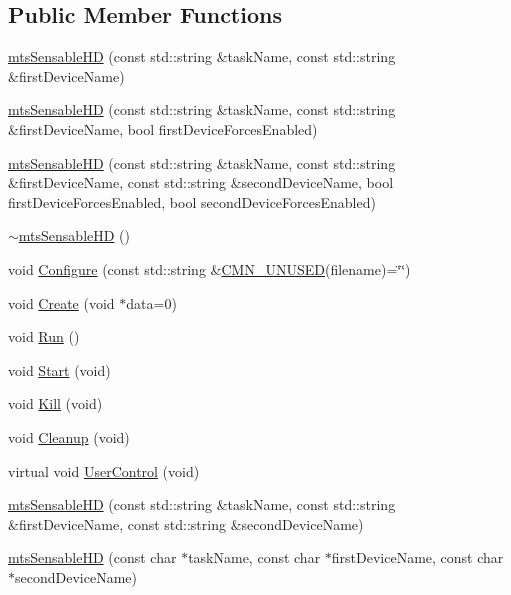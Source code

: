 \subsection*{Public Member Functions}
\begin{DoxyCompactItemize}
\item 
\hyperlink{classmts_sensable_h_d_a8edc1b99888eea9146e97e9e1e4244a2}{mts\+Sensable\+H\+D} (const std\+::string \&task\+Name, const std\+::string \&first\+Device\+Name)
\item 
\hyperlink{classmts_sensable_h_d_a65eb4de4d62c141f61b4c5afaa3b12ca}{mts\+Sensable\+H\+D} (const std\+::string \&task\+Name, const std\+::string \&first\+Device\+Name, bool first\+Device\+Forces\+Enabled)
\item 
\hyperlink{classmts_sensable_h_d_a21ff41ea6bf303e046d42f1c5843d31a}{mts\+Sensable\+H\+D} (const std\+::string \&task\+Name, const std\+::string \&first\+Device\+Name, const std\+::string \&second\+Device\+Name, bool first\+Device\+Forces\+Enabled, bool second\+Device\+Forces\+Enabled)
\item 
\hyperlink{classmts_sensable_h_d_a9fbacf9fb330e6acb3715bcb1f6ff66e}{$\sim$mts\+Sensable\+H\+D} ()
\item 
void \hyperlink{classmts_sensable_h_d_a3819baf43b57192a1a339a942d2fa0d7}{Configure} (const std\+::string \&\hyperlink{cmn_portability_8h_a021894e2626935fa2305434b1e893ff6}{C\+M\+N\+\_\+\+U\+N\+U\+S\+E\+D}(filename)=\char`\"{}\char`\"{})
\item 
void \hyperlink{classmts_sensable_h_d_a842668ae5afc97ce4513ef6c619e0a3c}{Create} (void $\ast$data=0)
\item 
void \hyperlink{classmts_sensable_h_d_a9fbf2831f6dfbb39089c53a411bff751}{Run} ()
\item 
void \hyperlink{classmts_sensable_h_d_a7541d19a105b37a06e943e503a6eea2f}{Start} (void)
\item 
void \hyperlink{classmts_sensable_h_d_a735f1a0600ddd91e112e92e520d07d46}{Kill} (void)
\item 
void \hyperlink{classmts_sensable_h_d_ae55b2349e493058a723ca94d54f341d0}{Cleanup} (void)
\item 
virtual void \hyperlink{classmts_sensable_h_d_a42fe43b1265e162e83ed815e726955da}{User\+Control} (void)
\end{DoxyCompactItemize}
{\bf }\par
\begin{DoxyCompactItemize}
\item 
\hyperlink{classmts_sensable_h_d_aed43dbeb27fa30622e969a8cf471a697}{mts\+Sensable\+H\+D} (const std\+::string \&task\+Name, const std\+::string \&first\+Device\+Name, const std\+::string \&second\+Device\+Name)
\item 
\hyperlink{classmts_sensable_h_d_ac9efabdeee298603256c66885e4fe998}{mts\+Sensable\+H\+D} (const char $\ast$task\+Name, const char $\ast$first\+Device\+Name, const char $\ast$second\+Device\+Name)
\end{DoxyCompactItemize}

